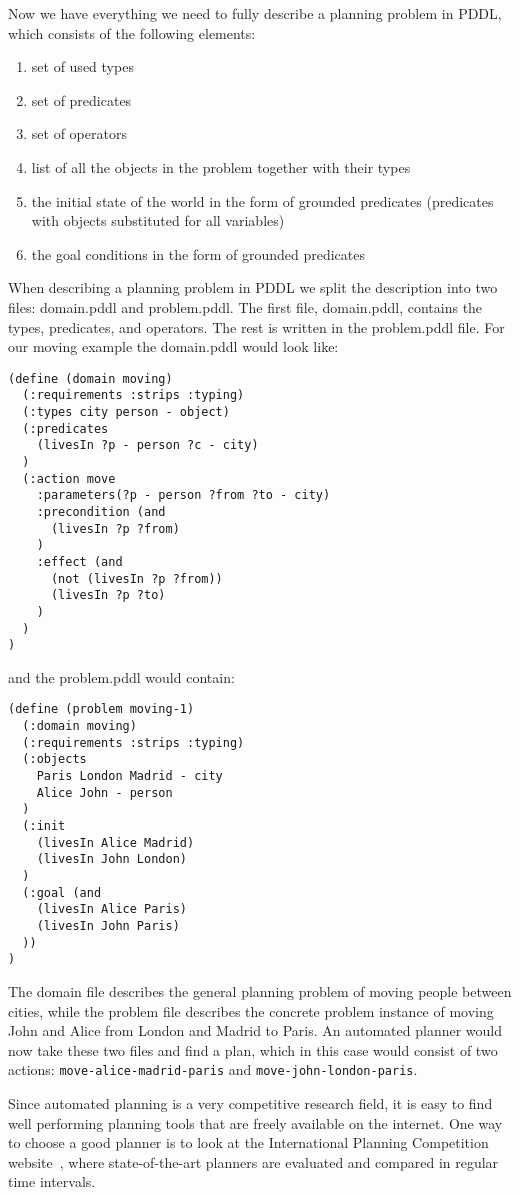 \documentclass[runningheads]{llncs}
\begin{document}
Now we have everything we need to fully describe a planning problem in PDDL, which consists of the following
elements:
\begin{enumerate}
\item set of used types
\item set of predicates
\item set of operators
\item list of all the objects in the problem together with their types
\item the initial state of the world in the form of grounded predicates (predicates with objects substituted for
all variables)
\item the goal conditions in the form of grounded predicates
\end{enumerate}

When describing a planning problem in PDDL we split the description into two files: domain.pddl and problem.pddl.
The first file, domain.pddl, contains the types, predicates, and operators. The rest is written in the problem.pddl
file. For our moving example the domain.pddl would look like:

\begin{verbatim}
(define (domain moving)
  (:requirements :strips :typing)
  (:types city person - object)
  (:predicates
    (livesIn ?p - person ?c - city)
  )
  (:action move
    :parameters(?p - person ?from ?to - city)
    :precondition (and
      (livesIn ?p ?from)
    )
    :effect (and
      (not (livesIn ?p ?from))
      (livesIn ?p ?to)
    )
  )
)
\end{verbatim}
and the problem.pddl would contain:
\begin{verbatim}
(define (problem moving-1)
  (:domain moving)
  (:requirements :strips :typing)
  (:objects
    Paris London Madrid - city
    Alice John - person
  )
  (:init
    (livesIn Alice Madrid)
    (livesIn John London)
  )
  (:goal (and
    (livesIn Alice Paris)
    (livesIn John Paris)
  ))
)
\end{verbatim}
The domain file describes the general planning problem of moving people between cities, while the problem
file describes the concrete problem instance of moving John and Alice from London and Madrid to Paris.
An automated planner would now take these two files and find a plan, which in this case would consist of two
actions: \verb _move-alice-madrid-paris_ and \verb _move-john-london-paris_.

Since automated planning is a very competitive research field, it is easy to find well performing
planning tools that are freely available on the internet. One way to choose a good planner is to look
at the International Planning Competition website~\cite{ipc}, where state-of-the-art planners are evaluated
and compared in regular time intervals.
\end{document}
